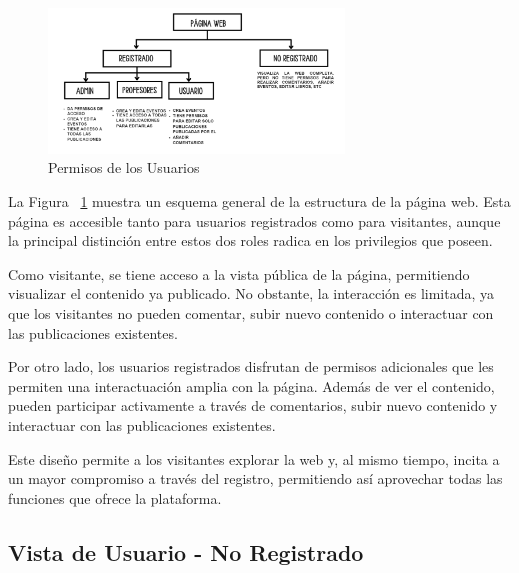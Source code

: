 \documentclass[a4paper, 12pt]{book}
\begin{document}
\begin{figure}
  \centering
  \includegraphics[width=0.7\textwidth]{img/esquema.png}
  \caption{Permisos de los Usuarios}
  \label{fig:arquitectura}
\end{figure}

La Figura ~\ref{fig:arquitectura} muestra un esquema general de la estructura de la página web. Esta página es accesible tanto para usuarios registrados 
como para visitantes, aunque la principal distinción entre estos dos roles radica en los privilegios que poseen.

Como visitante, se tiene acceso a la vista pública de la página, permitiendo visualizar el contenido ya publicado. No obstante, la interacción 
es limitada, ya que los visitantes no pueden comentar, subir nuevo contenido o interactuar con las publicaciones existentes.

Por otro lado, los usuarios registrados disfrutan de permisos adicionales que les permiten una interactuación amplia con la página. Además de ver el 
contenido, pueden participar activamente a través de comentarios, subir nuevo contenido y interactuar con las publicaciones existentes.

Este diseño permite a los visitantes explorar la web y, al mismo tiempo, incita a un mayor compromiso a través del registro, permitiendo así aprovechar 
todas las funciones que ofrece la plataforma.

\subsection{Vista de Usuario - No Registrado}
\label{sec:vista_usuarios_no_registrado}
\end{document}
